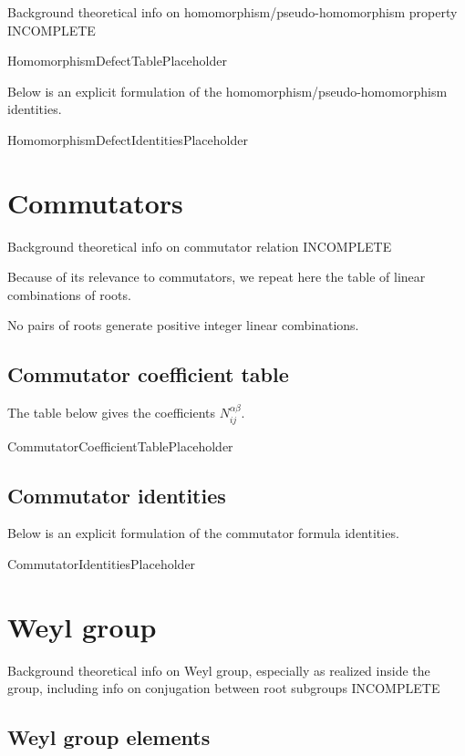 \documentclass[11pt]{article}
\newcommand{\noi}{\noindent}
\theoremstyle{definition}
\begin{document}
\noi Background theoretical info on homomorphism/pseudo-homomorphism property INCOMPLETE

\bigskip

HomomorphismDefectTablePlaceholder

\noi Below is an explicit formulation of the homomorphism/pseudo-homomorphism identities.

\bigskip

HomomorphismDefectIdentitiesPlaceholder

\newpage
\section{Commutators}

\noi Background theoretical info on commutator relation INCOMPLETE

\noi Because of its relevance to commutators, we repeat here the table of linear combinations of roots.

\noindent No pairs of roots generate positive integer linear combinations.


\subsection{Commutator coefficient table}

\noi The table below gives the coefficients $N_{ij}^{\alpha\beta}$.

CommutatorCoefficientTablePlaceholder

\subsection{Commutator identities}

\noi Below is an explicit formulation of the commutator formula identities.

CommutatorIdentitiesPlaceholder

\newpage
\section{Weyl group}

\noi Background theoretical info on Weyl group, especially as realized inside the group, including info on conjugation between root subgroups INCOMPLETE

\subsection{Weyl group elements}
\end{document}
